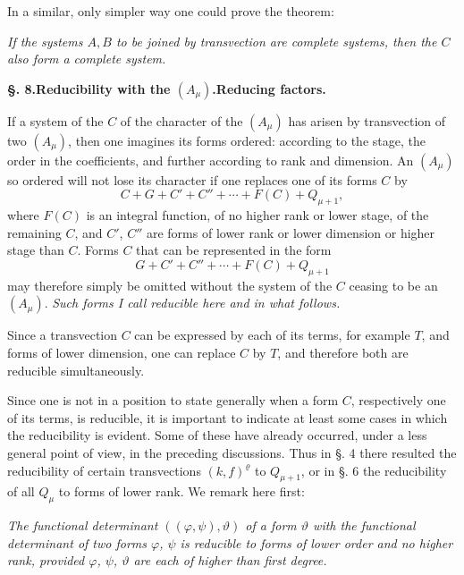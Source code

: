 \documentclass[10pt]{article}
\begin{document}
In a similar, only simpler way one could prove the theorem:

\emph{If the systems $A,B$ to be joined by transvection are complete systems, then the $C$ also form a complete system.}

\begin{center}
{\bfseries §. 8.\quad Reducibility with the $(A_\mu)$.\quad Reducing factors.}
\end{center}

If a system of the $C$ of the character of the $(A_\mu)$ has arisen by transvection of two $(A_\mu)$, then one imagines its forms ordered: according to the stage, the order in the coefficients, and further according to rank and dimension. An $(A_\mu)$ so ordered will not lose its character if one replaces one of its forms $C$ by
\[
C+G+C'+C''+\cdots+F(C)+Q_{\mu+1},
\]
where $F(C)$ is an integral function, of no higher rank or lower stage, of the remaining $C$, and $C'$, $C''$ are forms of lower rank or lower dimension or higher stage than $C$. Forms $C$ that can be represented in the form
\[
G+C'+C''+\cdots+F(C)+Q_{\mu+1}
\]
may therefore simply be omitted without the system of the $C$ ceasing to be an $(A_\mu)$. \emph{Such forms I call reducible here and in what follows.}

Since a transvection $C$ can be expressed by each of its terms, for example $T$, and forms of lower dimension, one can replace $C$ by $T$, and therefore both are reducible simultaneously.

Since one is not in a position to state generally when a form $C$, respectively one of its terms, is reducible, it is important to indicate at least some cases in which the reducibility is evident. Some of these have already occurred, under a less general point of view, in the preceding discussions. Thus in §. 4 there resulted the reducibility of certain transvections $(k,f)^\varrho$ to $Q_{\mu+1}$, or in §. 6 the reducibility of all $Q_\mu$ to forms of lower rank. We remark here first:

\emph{The functional determinant $((\varphi,\psi),\vartheta)$ of a form $\vartheta$ with the functional determinant of two forms $\varphi$, $\psi$ is reducible to forms of lower order and no higher rank, provided $\varphi$, $\psi$, $\vartheta$ are each of higher than first degree.}
\end{document}
